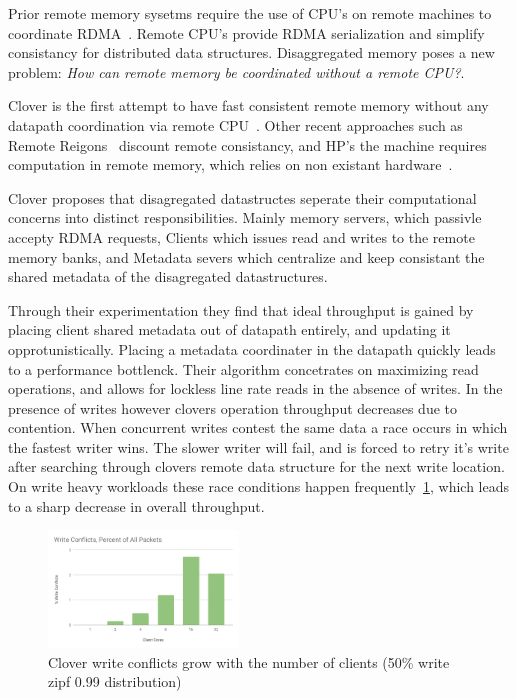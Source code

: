 Prior remote memory sysetms require the use of CPU's on remote
machines to coordinate RDMA~\cite{cell,sonuma,storm,erpc,farm}. Remote
CPU's provide RDMA serialization and simplify consistancy for
distributed data structures. Disaggregated memory poses a new problem:
\textit{How can remote memory be coordinated without a remote CPU?}.

Clover is the first attempt to have fast consistent remote memory
without any datapath coordination via remote CPU~\cite{clover}. Other
recent approaches such as Remote Reigons~\cite{reigons} discount
remote consistancy, and HP's the machine requires computation in
remote memory, which relies on non existant
hardware~\cite{aguilera2019designing}.

Clover proposes that disagregated datastructes seperate their
computational concerns into distinct responsibilities. Mainly memory
servers, which passivle accepty RDMA requests, Clients which issues read and
writes to the remote memory banks, and Metadata severs which
centralize and keep consistant the shared metadata of the disagregated
datastructures.

Through their experimentation they find that ideal throughput is
gained by placing client shared metadata out of datapath entirely, and
updating it opprotunistically. Placing a metadata coordinater in the
datapath quickly leads to a performance bottlenck. Their algorithm
concetrates on maximizing read operations, and allows for lockless
line rate reads in the absence of writes. In the presence of writes
however clovers operation throughput decreases due to contention. When
concurrent writes contest the same data a race occurs in which the
fastest writer wins. The slower writer will fail, and is forced to
retry it's write after searching through clovers remote data structure
for the next write location. On write heavy workloads these race
conditions happen frequently~\ref{fig:conflicts}, which leads to a
sharp decrease in overall throughput.

\begin{figure}
    \includegraphics[width=0.45\textwidth]{fig/write_conflicts.pdf}
    \caption{Clover write conflicts grow with the number of clients
    (50\% write zipf 0.99 distribution)}
    \label{fig:conflicts}
\end{figure}


